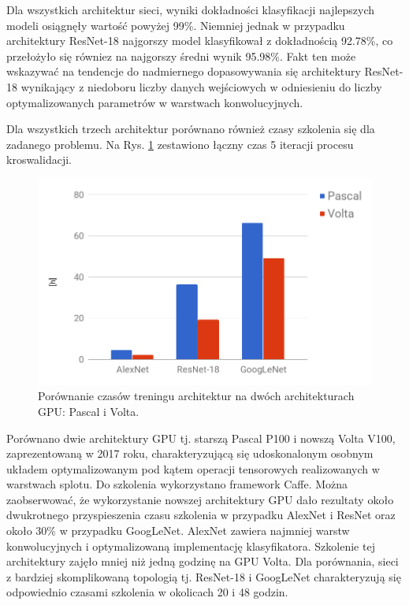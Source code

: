 Dla wszystkich architektur sieci, wyniki dokładności klasyfikacji najlepszych modeli osiągnęły wartość powyżej 99\%. Niemniej jednak w przypadku architektury ResNet-18 najgorszy model klasyfikował z dokładnością 92.78\%, co przełożyło się równiez na najgorszy średni wynik 95.98\%. Fakt ten może wskazywać na tendencje do nadmiernego dopasowywania się architektury ResNet-18 wynikający z niedoboru liczby danych wejściowych w odniesieniu do liczby optymalizowanych parametrów w warstwach konwolucyjnych.

Dla wszystkich trzech architektur porównano również czasy szkolenia się dla zadanego problemu. Na Rys. \ref{fig:training_times} zestawiono łączny czas 5 iteracji procesu kroswalidacji.

\begin{figure}[h!]
	\includegraphics[width=\textwidth]{figures/TrainingtimesChart.png}
	\caption{Porównanie czasów treningu architektur na dwóch architekturach GPU: Pascal i Volta.}
	\label{fig:training_times}
\end{figure}

Porównano dwie architektury GPU tj. starszą Pascal P100 i nowszą Volta V100, zaprezentowaną w 2017 roku, charakteryzującą się udoskonalonym osobnym układem optymalizowanym pod kątem operacji tensorowych realizowanych w warstwach splotu. Do szkolenia wykorzystano framework Caffe. Można zaobserwować, że wykorzystanie nowszej architektury GPU dało rezultaty około dwukrotnego przyspieszenia czasu szkolenia w przypadku AlexNet i ResNet oraz około 30\% w przypadku GoogLeNet. AlexNet zawiera najmniej warstw konwolucyjnych i optymalizowaną implementację klasyfikatora. Szkolenie tej architektury zajęło mniej niż jedną godzinę na GPU Volta. Dla porównania, sieci z bardziej skomplikowaną topologią tj. ResNet-18 i GoogLeNet charakteryzują się odpowiednio czasami szkolenia w okolicach 20 i 48 godzin. 

